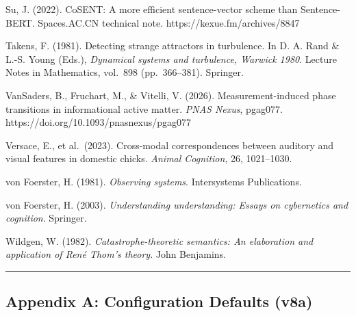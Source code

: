 \documentclass[
  11pt]{article}
\begin{document}
Su, J. (2022). CoSENT: A more efficient sentence-vector scheme than
Sentence-BERT. Spaces.AC.CN technical note.
https://kexue.fm/archives/8847

Takens, F. (1981). Detecting strange attractors in turbulence. In D. A.
Rand \& L.-S. Young (Eds.), \emph{Dynamical systems and turbulence,
Warwick 1980}. Lecture Notes in Mathematics, vol.~898 (pp.~366--381).
Springer.

VanSaders, B., Fruchart, M., \& Vitelli, V. (2026). Measurement-induced
phase transitions in informational active matter. \emph{PNAS Nexus},
pgag077. https://doi.org/10.1093/pnasnexus/pgag077

Versace, E., et al.~(2023). Cross-modal correspondences between auditory
and visual features in domestic chicks. \emph{Animal Cognition}, 26,
1021--1030.

von Foerster, H. (1981). \emph{Observing systems}. Intersystems
Publications.

von Foerster, H. (2003). \emph{Understanding understanding: Essays on
cybernetics and cognition}. Springer.

Wildgen, W. (1982). \emph{Catastrophe-theoretic semantics: An
elaboration and application of René Thom's theory}. John Benjamins.

\begin{center}\rule{0.5\linewidth}{0.5pt}\end{center}

\subsection{Appendix A: Configuration Defaults
(v8a)}\label{appendix-a-configuration-defaults-v8a}
\end{document}
